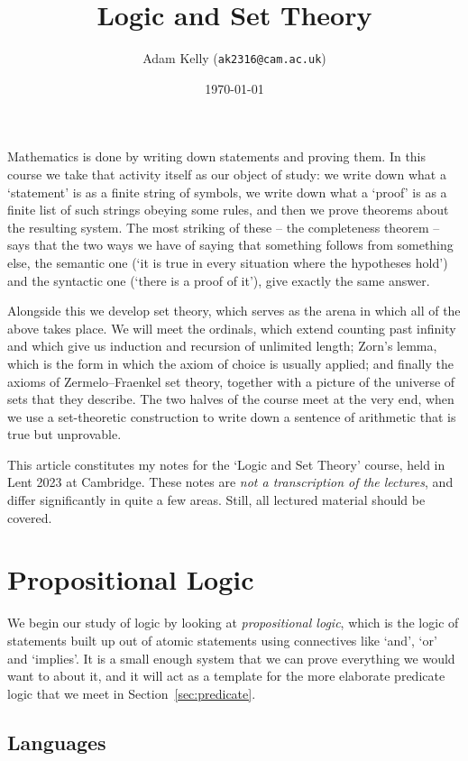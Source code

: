 \documentclass[a4paper]{scrartcl}
\title{Logic and Set Theory}
\author{Adam Kelly (\texttt{ak2316@cam.ac.uk})}
\date{\today}
\begin{document}
\maketitle

Mathematics is done by writing down statements and proving them. In this course we take that activity itself as our object of study: we write down what a `statement' is as a finite string of symbols, we write down what a `proof' is as a finite list of such strings obeying some rules, and then we prove theorems about the resulting system. The most striking of these -- the completeness theorem -- says that the two ways we have of saying that something follows from something else, the semantic one (`it is true in every situation where the hypotheses hold') and the syntactic one (`there is a proof of it'), give exactly the same answer.

Alongside this we develop set theory, which serves as the arena in which all of the above takes place. We will meet the ordinals, which extend counting past infinity and which give us induction and recursion of unlimited length; Zorn's lemma, which is the form in which the axiom of choice is usually applied; and finally the axioms of Zermelo--Fraenkel set theory, together with a picture of the universe of sets that they describe. The two halves of the course meet at the very end, when we use a set-theoretic construction to write down a sentence of arithmetic that is true but unprovable.

This article constitutes my notes for the `Logic and Set Theory' course, held in Lent 2023 at Cambridge. These notes are \emph{not a transcription of the lectures}, and differ significantly in quite a few areas. Still, all lectured material should be covered.

\tableofcontents

\section{Propositional Logic}

We begin our study of logic by looking at \emph{propositional logic}, which is the logic of statements built up out of atomic statements using connectives like `and', `or' and `implies'. It is a small enough system that we can prove everything we would want to about it, and it will act as a template for the more elaborate predicate logic that we meet in Section~\ref{sec:predicate}.

\subsection{Languages}
\end{document}
